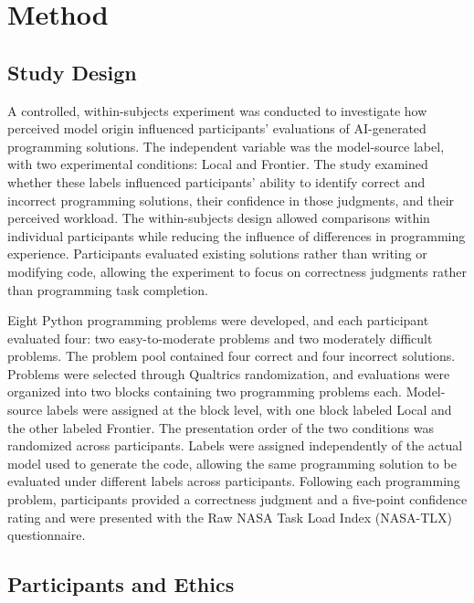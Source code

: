 \documentclass[manuscript,review]{acmart}
\begin{document}
\section{Method}
\subsection{Study Design}
A controlled, within-subjects experiment was conducted to investigate how perceived model origin influenced participants' evaluations of AI-generated programming solutions. The independent variable was the model-source label, with two experimental conditions: Local and Frontier. The study examined whether these labels influenced participants' ability to identify correct and incorrect programming solutions, their confidence in those judgments, and their perceived workload. The within-subjects design allowed comparisons within individual participants while reducing the influence of differences in programming experience. Participants evaluated existing solutions rather than writing or modifying code, allowing the experiment to focus on correctness judgments rather than programming task completion.

Eight Python programming problems were developed, and each participant evaluated four: two easy-to-moderate problems and two moderately difficult problems. The problem pool contained four correct and four incorrect solutions. Problems were selected through Qualtrics randomization, and evaluations were organized into two blocks containing two programming problems each. Model-source labels were assigned at the block level, with one block labeled Local and the other labeled Frontier. The presentation order of the two conditions was randomized across participants. Labels were assigned independently of the actual model used to generate the code, allowing the same programming solution to be evaluated under different labels across participants. Following each programming problem, participants provided a correctness judgment and a five-point confidence rating and were presented with the Raw NASA Task Load Index (NASA-TLX) questionnaire.

\subsection{Participants and Ethics}
\end{document}
